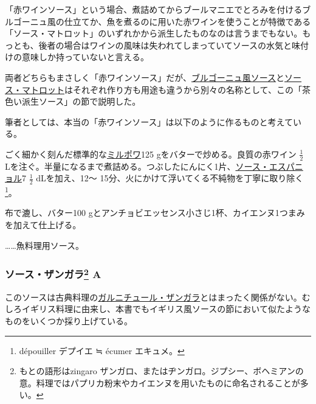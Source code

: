 \begin{recette}


「赤ワインソース」という場合、煮詰めてからブールマニエでとろみを付けるブルゴーニュ風の仕立てか、魚を煮るのに用いた赤ワインを使うことが特徴である「ソース・マトロット」のいずれかから派生したものなのは言うまでもない。もっとも、後者の場合はワインの風味は失われてしまっていてソースの水気と味付けの意味しか持っていないと言える。

両者どちらもまさしく「赤ワインソース」だが、\protect\hyperlink{sauce-bourguignonne}{ブルゴーニュ風ソース}と\protect\hyperlink{sauce-matelote}{ソース・マトロット}はそれぞれ作り方も用途も違うから別々の名称として、この「茶色い派生ソース」の節で説明した。

筆者としては、本当の「赤ワインソース」は以下のように作るものと考えている。

ごく細かく刻んだ標準的な\protect\hyperlink{mirepoix}{ミルポワ}125
gをバターで炒める。良質の赤ワイン \(\frac{1}{2}\)
Lを注ぐ。半量になるまで煮詰める。つぶしたにんにく1片、\protect\hyperlink{sauce-espagnole}{ソース・エスパニョル}7
\(\frac{1}{2}\) dLを加え、12〜
15分、火にかけて浮いてくる不純物を丁寧に取り除く\footnote{dépouiller
  デプイエ ≒ écumer エキュメ。}。

布で漉し、バター100
gとアンチョビエッセンス小さじ1杯、カイエンヌ1つまみを加えて仕上げる。

\ldots{}\ldots{}魚料理用ソース。

\hypertarget{sauce-zingara-a}{%
\subsubsection[ソース・ザンガラ
A]{\texorpdfstring{ソース・ザンガラ\footnote{もとの語形はzingaro
  ザンガロ、またはヂンガロ。ジプシー、ボヘミアンの意。料理ではパプリカ粉末やカイエンヌを用いたものに命名されることが多い。}
A}{ソース・ザンガラ A}}\label{sauce-zingara-a}}



このソースは古典料理の\protect\hyperlink{garniture-zingara}{ガルニチュール・ザンガラ}とはまったく関係がない。むしろイギリス料理に由来し、本書でもイギリス風ソースの節において似たようなものをいくつか採り上げている。


\end{recette}
